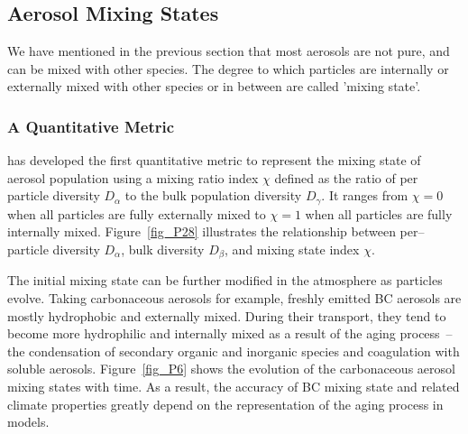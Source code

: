 \documentclass[12pt, fullpage]{uiucthesis2009}
\begin{document}
	
	\subsection{Aerosol Mixing States}
	We have mentioned in the previous section that most aerosols are not pure, and can be mixed with other species. The degree to which particles are internally or externally mixed with other species or in between are called 'mixing state'.  

	\subsubsection{A Quantitative Metric}
	\cite{Riemer2013} has developed the first quantitative metric to represent the mixing state of aerosol population using a mixing ratio index $\chi$ defined as the ratio of per particle diversity $D_{\alpha}$ to the bulk population diversity $D_{\gamma}$. It ranges from $\chi = 0$ when all particles are fully externally mixed to $\chi = 1$ when all particles are fully internally mixed. Figure~\ref{fig_P28} illustrates the relationship between per--particle diversity $D_{\alpha}$, bulk diversity $D_{\beta}$, and mixing state index $\chi$.
	
	The initial mixing state can be further modified in the atmosphere as particles evolve. Taking carbonaceous aerosols for example, freshly emitted BC aerosols are mostly hydrophobic and externally mixed. During their transport, they tend to become more hydrophilic and internally mixed as a result of the aging process~--the condensation of secondary organic and inorganic species and coagulation with soluble aerosols. Figure~\ref{fig_P6} shows the evolution of the carbonaceous aerosol mixing states with time. As a result, the accuracy of BC mixing state and related climate properties greatly depend on the representation of the aging process in models.
	
\end{document}
